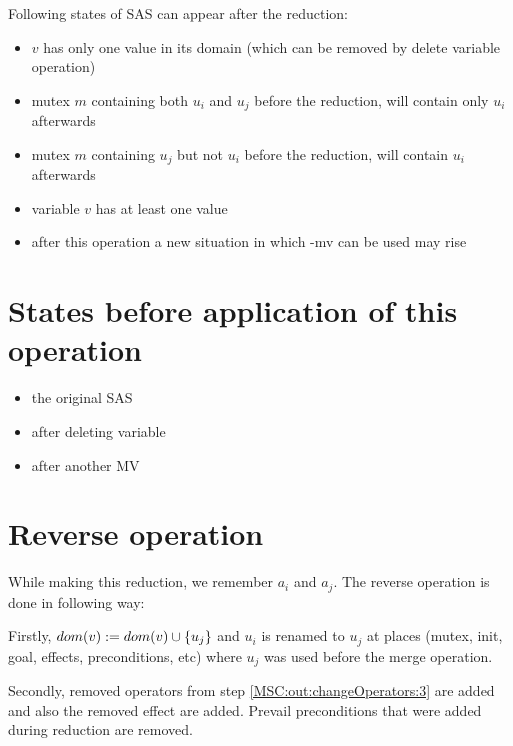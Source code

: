 	Following states of SAS can appear after the reduction:
	
	\begin{itemize}
		\item $v$ has only one value in its domain (which can be removed by delete variable operation)
		\item mutex $m$ containing both $u_i$ and $u_j$ before the reduction, will contain only $u_i$ afterwards
		\item mutex $m$ containing $u_j$ but not $u_i$ before the reduction, will contain $u_i$ afterwards
		\item variable $v$ has at least one value
		\item after this operation a new situation in which -mv can be used may rise
	\end{itemize}
	
	
	\section{States before application of this operation}
	\begin{itemize}
		\item the original SAS
		\item after deleting variable 
		\item after another MV
	\end{itemize}
	
	
	
	\section{Reverse operation}
	
	While making this reduction, we remember $a_i$ and $a_j$. The reverse operation is done in following way:
	
	Firstly, $dom(v) := dom(v) \cup \{u_j\}$ and $u_i$ is renamed to $u_j$ at places (mutex, init, goal, effects, preconditions, etc) where $u_j$ was used before the merge operation.
	
	Secondly, removed operators from step \ref{MSC:out:changeOperators:3} are added and also the removed effect are added. Prevail preconditions that were added during reduction are removed.
	
